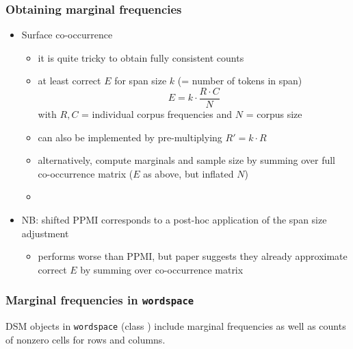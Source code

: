 \documentclass[t]{beamer} %
\begin{document}
\begin{frame}
  \frametitle{Obtaining marginal frequencies}

  \begin{itemize}
  \item Surface co-occurrence
    \begin{itemize}
    \item it is quite tricky to obtain fully consistent counts \citep{Evert:08}
    \item at least correct $E$ for span size $k$ (= number of tokens in span)
      \[
      E = k\cdot \frac{R\cdot C}{N}
      \]
      with $R, C$ = individual corpus frequencies and $N$ = corpus size
    \item can also be implemented by pre-multiplying $R' = k\cdot R$
    \item[\hand] alternatively, compute marginals and sample size by summing
      over full co-occurrence matrix (\so $E$ as above, but inflated $N$)
    \item[]
    \end{itemize}
  \item<2-> NB: shifted PPMI \citep{Levy:Goldberg:14} corresponds to a post-hoc application of the span size adjustment
    \begin{itemize}
    \item performs worse than PPMI, but paper suggests they already
      approximate correct $E$ by summing over co-occurrence matrix
    \end{itemize}
  \end{itemize}
\end{frame}

\begin{frame}[fragile]
  \frametitle{Marginal frequencies in \texttt{wordspace}}
  
  DSM objects in \texttt{wordspace} (class ) include marginal frequencies as well as
  counts of nonzero cells for rows and columns.
\end{frame}
\end{document}
